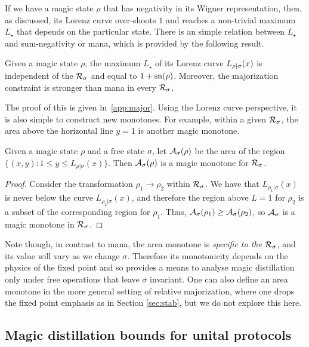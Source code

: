 \documentclass[pra,
aps,
twocolumn,
superscriptaddress,
groupedaddress,
nofootinbib,
reprint
]{revtex4-1}
\begin{document}
If we have a magic state $\rho$ that has negativity in its Wigner representation, then, as discussed, its Lorenz curve over-shoots $1$ and reaches a non-trivial maximum $L_\star$ that depends on the particular state. There is an simple relation between $L_\star$ and sum-negativity or mana, which is provided by the following result. 
\begin{theorem}\label{lem:lcmax}
	Given a magic state $\rho$, the maximum $L_\star$ of its Lorenz curve ${L_{\rho|\sigma}}(x)$ is independent of the ${\mathcal R}_\sigma$ and equal to $1+{{\rm{sn}}(\rho)}$. Moreover, the majorization constraint is stronger than mana in every ${\mathcal R}_\sigma$.
\end{theorem}
The proof of this is given in~\cref{app:major}. Using the Lorenz curve perspective, it is also simple to construct new monotones. For example, within a given ${\mathcal R}_\sigma$, the area above the horizontal line $y = 1$ is another magic monotone.
\begin{lemma}
Given a magic state $\rho$ and a free state $\sigma$, let ${\mathcal A}_\sigma(\rho)$ be the area of the region $\{(x, y): 1 \leq y \leq L_{\rho | \sigma}(x)\}$. Then ${\mathcal A}_\sigma(\rho)$ is a magic monotone for ${\mathcal R}_\sigma$.
\end{lemma}
\begin{proof}
Consider the transformation $\rho_1 \rightarrow \rho_2$ within ${\mathcal R}_\sigma$. We have that $L_{\rho_1|\sigma}(x)$ is never below the curve $L_{\rho_2|\sigma}(x)$, and therefore the region above $L=1$ for $\rho_2$ is a subset of the corresponding region for $\rho_1$. Thus, ${\mathcal A}_\sigma(\rho_1) \geq {\mathcal A}_\sigma(\rho_2)$, so ${\mathcal A}_\sigma$ is a magic monotone in ${\mathcal R}_\sigma$.
\end{proof}
Note though, in contrast to mana, the area monotone is \emph{specific to the ${\mathcal R}_\sigma$}, and its value will vary as we change $\sigma$. Therefore its monotonicity depends on the physics of the fixed point and so provides a means to analyse magic distillation only under free operations that leave $\sigma$ invariant. One can also define an area monotone in the more general setting of relative majorization, where one drops the fixed point emphasis as in Section \ref{sec:stab}, but we do not explore this here.

\subsection{Magic distillation bounds for unital protocols}
\label{sec:unital}
\end{document}
